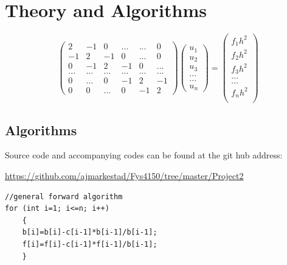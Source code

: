 \documentclass[a4paper,11pt]{article}
\begin{document}
{\section*{Theory and Algorithms}
		\begin{equation}
\begin{pmatrix}
	2 & -1 & 0 & ... & ... & 0 \\
	-1 & 2 & -1 & 0 & ... & 0 \\
	0 & -1 & 2 & -1 & 0 & ... \\
	... & ... & ... & ... & ... & ... \\
	0 & ... & 0 & -1 & 2 & -1 \\
	0 & 0 & ... & 0 & -1 & 2 
	\end{pmatrix} \begin{pmatrix}
	u_1\\
	u_2\\
	u_3\\
	...\\
	...\\
	u_n
	\end{pmatrix} = \begin{pmatrix}
	f_1 h^2 \\
	f_2 h^2 \\
	f_3 h^2 \\
	... \\
	... \\
	f_n h^2 \\
	\end{pmatrix}
\end{equation}		




\subsection{Algorithms}

Source code and accompanying codes can be found at the git hub address:

\url{https://github.com/ajmarkestad/Fys4150/tree/master/Project2} 


\begin{lstlisting}
//general forward algorithm
for (int i=1; i<=n; i++)
	{
	b[i]=b[i]-c[i-1]*b[i-1]/b[i-1];
	f[i]=f[i]-c[i-1]*f[i-1]/b[i-1];
	}
\end{lstlisting}


}
\end{document}
